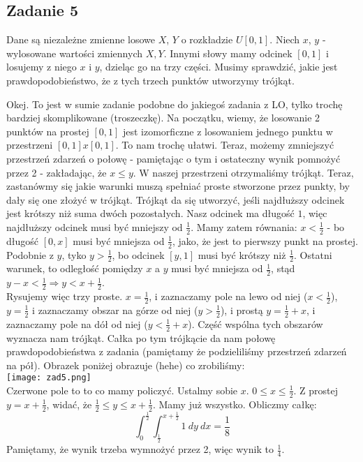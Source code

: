 \documentclass[a4paper]{article}
\begin{document}
\subsection*{Zadanie 5}
Dane są niezależne zmienne losowe $X$, $Y$ o rozkładzie $U[0,1]$. Niech $x$, $y$ - wylosowane wartości zmiennych $X,Y$. Innymi słowy mamy odcinek $[0,1]$ i losujemy z niego $x$ i $y$, dzieląc go na trzy części. Musimy sprawdzić, jakie jest prawdopodobieństwo, że z tych trzech punktów utworzymy trójkąt.

Okej. To jest w sumie zadanie podobne do jakiegoś zadania z LO, tylko trochę bardziej skomplikowane (troszeczkę). Na początku, wiemy, że losowanie 2 punktów na prostej $[0,1]$ jest izomorficzne z losowaniem jednego punktu w przestrzeni $[0,1]x[0,1]$. To nam trochę ułatwi. Teraz, możemy zmniejszyć przestrzeń zdarzeń o połowę - pamiętając o tym i ostateczny wynik pomnożyć przez 2 - zakładając, że $x\leq y$. W naszej przestrzeni otrzymaliśmy trójkąt. Teraz, zastanówmy się jakie warunki muszą spełniać proste stworzone przez punkty, by dały się one złożyć w trójkąt. Trójkąt da się utworzyć, jeśli najdłuższy odcinek jest krótszy niż suma dwóch pozostałych. Nasz odcinek ma długość $1$, więc najdłuższy odcinek musi być mniejszy od $\frac{1}{2}$. Mamy zatem równania: $x<\frac{1}{2}$ - bo długość $[0,x]$ musi być mniejsza od $\frac{1}{2}$, jako, że jest to pierwszy punkt na prostej. Podobnie z $y$, tyko $y>\frac{1}{2}$, bo odcinek $[y,1]$ musi być krótszy niż $\frac{1}{2}$. Ostatni warunek, to odległość pomiędzy $x$ a $y$ musi być mniejsza od $\frac{1}{2}$, stąd $y-x<\frac{1}{2} \Rightarrow y<x+\frac{1}{2}$.\\
Rysujemy więc trzy proste. $x=\frac{1}{2}$, i zaznaczamy pole na lewo od niej ($x<\frac{1}{2}$), $y=\frac{1}{2}$ i zaznaczamy obszar na górze od niej ($y>\frac{1}{2}$), i prostą $y=\frac{1}{2}+x$, i zaznaczamy pole na dół od niej ($y<\frac{1}{2}+x$). Część wspólna tych obszarów wyznacza nam trójkąt. Całka po tym trójkącie da nam połowę prawdopodobieństwa z zadania (pamiętamy że podzieliliśmy przestrzeń zdarzeń na pół). Obrazek poniżej obrazuje (hehe) co zrobiliśmy:\\
\texttt{[image: zad5.png]}\\
Czerwone pole to to co mamy policzyć.
Ustalmy sobie $x$. $0 \leq x \leq \frac{1}{2}$. Z prostej $y=x+\frac{1}{2}$, widać, że $\frac{1}{2} \leq y \leq x + \frac{1}{2}$. Mamy już wszystko. Obliczmy całkę:
$$\int_0^\frac{1}{2} \int_\frac{1}{2}^{x+\frac{1}{2}} 1\ dy\ dx = \frac{1}{8}$$
Pamiętamy, że wynik trzeba wymnożyć przez 2, więc wynik to $\frac{1}{4}$.
\end{document}
